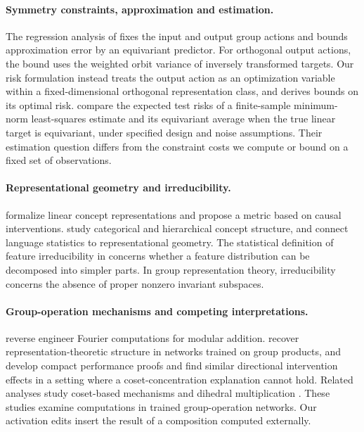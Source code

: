 \paragraph{Symmetry constraints, approximation and estimation.}
The regression analysis of \citet[Section~4.3, Theorem~4.9 and Corollary~4.10]{wang2023equivariance} fixes the input and output group actions and bounds approximation error by an equivariant predictor. For orthogonal output actions, the bound uses the weighted orbit variance of inversely transformed targets. Our risk formulation instead treats the output action as an optimization variable within a fixed-dimensional orthogonal representation class, and derives bounds on its optimal risk. \citet[Theorem~13]{elesedy2021generalisation} compare the expected test risks of a finite-sample minimum-norm least-squares estimate and its equivariant average when the true linear target is equivariant, under specified design and noise assumptions. Their estimation question differs from the constraint costs we compute or bound on a fixed set of observations.

\paragraph{Representational geometry and irreducibility.}
\citet{park2023linear} formalize linear concept representations and propose a metric based on causal interventions. \citet{park2025categorical} study categorical and hierarchical concept structure, and \citet{karkada2026emergent} connect language statistics to representational geometry. The statistical definition of feature irreducibility in \citet[Section~3.1]{engels2025notall} concerns whether a feature distribution can be decomposed into simpler parts. In group representation theory, irreducibility concerns the absence of proper nonzero invariant subspaces.

\paragraph{Group-operation mechanisms and competing interpretations.}
\citet{nanda2023progress} reverse engineer Fourier computations for modular addition. \citet{chughtai2023toy} recover representation-theoretic structure in networks trained on group products, and \citet{wu2025unified} develop compact performance proofs and find similar directional intervention effects in a setting where a coset-concentration explanation cannot hold. Related analyses study coset-based mechanisms \citep{stander2024cosets} and dihedral multiplication \citep{wei2026dihedral}. These studies examine computations in trained group-operation networks. Our activation edits insert the result of a composition computed externally.

